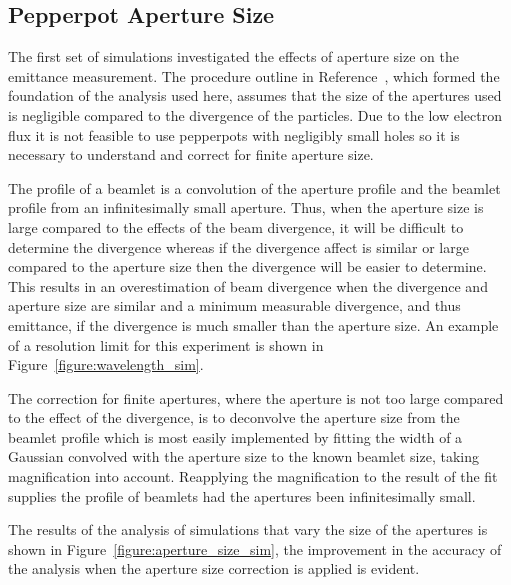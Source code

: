 \subsection{Pepperpot Aperture Size}

The first set of simulations investigated the effects of aperture size on the emittance measurement.
The procedure outline in Reference~\cite{zhang_emittance_1996}, which formed the foundation of the analysis used here, assumes that the size of the apertures used is negligible compared to the divergence of the particles.
Due to the low electron flux it is not feasible to use pepperpots with negligibly small holes so it is necessary to understand and correct for finite aperture size.

The profile of a beamlet is a convolution of the aperture profile and the beamlet profile from an infinitesimally small aperture.
Thus, when the aperture size is large compared to the effects of the beam divergence, it will be difficult to determine the divergence whereas if the divergence affect is similar or large compared to the aperture size then the divergence will be easier to determine.
This results in an overestimation of beam divergence when the divergence and aperture size are similar and a minimum measurable divergence, and thus emittance, if the divergence is much smaller than the aperture size.
An example of a resolution limit for this experiment is shown in Figure~\ref{figure:wavelength_sim}.

The correction for finite apertures, where the aperture is not too large compared to the effect of the divergence, is to deconvolve the aperture size from the beamlet profile which is most easily implemented by fitting the width of a Gaussian convolved with the aperture size to the known beamlet size, taking magnification into account.
Reapplying the magnification to the result of the fit supplies the profile of beamlets had the apertures been infinitesimally small.

The results of the analysis of simulations that vary the size of the apertures is shown in Figure~\ref{figure:aperture_size_sim}, the improvement in the accuracy of the analysis when the aperture size correction is applied is evident.

